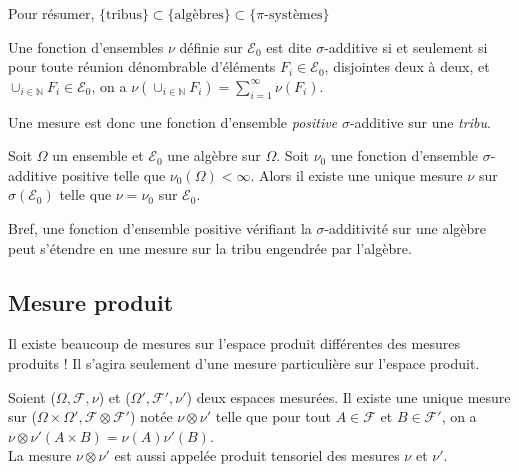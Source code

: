 \documentclass[landscape,twocolumn]{article}
\begin{document}
\begin{expli}
Pour résumer, $\{ \mbox{tribus} \} \subset \{ \mbox{algèbres} \} \subset \{ \pi \mbox{-systèmes} \}$
\end{expli}

\begin{defin}
Une fonction d'ensembles $\nu$ définie sur $\mathcal{E}_0$ est dite $\sigma$-additive si et seulement si pour toute réunion dénombrable d'éléments $F_i \in \mathcal{E}_0$, disjointes deux à deux, et $\cup_{i \in \mathbb{N}} F_i \in \mathcal{E}_0$, on a $\nu (\cup_{i \in \mathbb{N}} F_i) = \sum \limits_{i=1}^{\infty} \nu (F_i)$.
\end{defin}

\begin{expli}
Une mesure est donc une fonction d'ensemble \textit{positive} $\sigma$-additive sur une \textit{tribu}.
\end{expli}

\begin{theo}
Soit $\Omega$ un ensemble et $\mathcal{E}_0$ une algèbre sur $\Omega$. Soit $\nu_0$ une fonction d'ensemble $\sigma$-additive positive telle que $\nu_0 (\Omega) < \infty$. Alors il existe une unique mesure $\nu$ sur $\sigma(\mathcal{E}_0)$ telle que $\nu = \nu_0$ sur $\mathcal{E}_0$.
\end{theo}

\begin{expli}
Bref, une fonction d'ensemble positive vérifiant la $\sigma$-additivité sur une algèbre peut s'étendre en une mesure sur la tribu engendrée par l'algèbre.
\end{expli}

\subsection{Mesure produit}

\begin{att}
Il existe beaucoup de mesures sur l'espace produit différentes des mesures produits ! Il s'agira seulement d'une mesure particulière sur l'espace produit.
\end{att}

\begin{prop}
Soient ($\Omega, \mathcal{F}, \nu $) et ($\Omega ', \mathcal{F} ', \nu ' $) deux espaces mesurées. Il existe une unique mesure sur ($\Omega \times \Omega ', \mathcal{F} \otimes \mathcal{F}'$) notée $\nu \otimes \nu '$ telle que pour tout $A \in \mathcal{F}$ et $B \in \mathcal{F}'$, on a $\nu \otimes \nu ' ( A \times B) = \nu (A) \nu ' (B)$. \\
La mesure $\nu \otimes \nu '$ est aussi appelée produit tensoriel des mesures $\nu$ et $\nu '$.
\end{prop}
\end{document}
